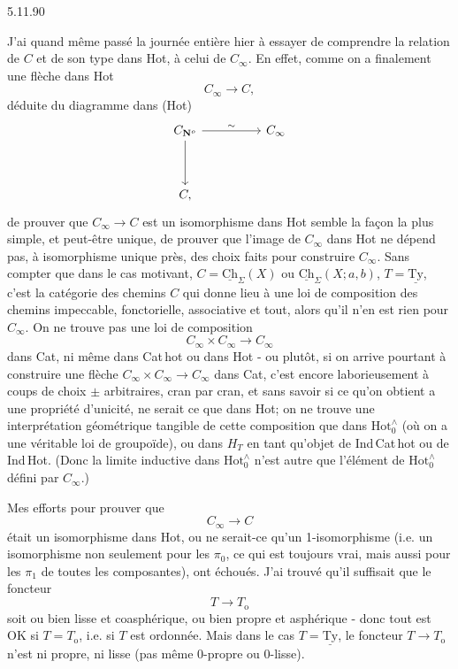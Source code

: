 \documentclass[11pt]{article}
\newcommand{\printedpage}[1]{\marginpar{\footnotesize p.~#1}}
\newcommand{\msp}[1]{\marginpar{\footnotesize [#1]}}
\newcommand{\Hotz}{\mathrm{Hot}^{\wedge}_{0}}
\newcommand{\Ch}{\underline{\mathrm{Ch}}}
\newcommand{\Ty}{\underline{\mathrm{Ty}}}
\newcommand{\CNo}{C_{\mathbf{N}^{o}}}
\begin{document}
\begin{flushright}
{\footnotesize 5.11.90}
\end{flushright}

J'ai quand même passé la journée entière hier à essayer de comprendre la relation de $C$ et de son type dans Hot, à celui de $C_{\infty}$. En effet, comme on a finalement une flèche dans Hot
\[
C_{\infty} \longrightarrow C,
\]
déduite du diagramme dans (Hot)
\[
\begin{tikzcd}[column sep=huge, row sep=huge]
\CNo \arrow[r, "\sim"] \arrow[d] & C_{\infty} \\
C, &
\end{tikzcd}
\]
de prouver que $C_{\infty} \longrightarrow C$ est un isomorphisme dans Hot
\msp{page 111}
semble la façon la plus simple, et peut-être unique, de prouver que l'image de $C_{\infty}$ dans Hot ne dépend pas, à isomorphisme unique près, des choix faits pour construire $C_{\infty}$. Sans compter que dans le cas motivant, $C = \Ch_{\Sigma}(X)$ ou $\Ch_{\Sigma}(X;a,b)$, $T = \Ty$, c'est la catégorie des chemins $C$ qui donne lieu à une loi de composition des chemins impeccable, fonctorielle, associative et tout, alors qu'il n'en est rien pour $C_{\infty}$. On ne trouve pas une loi de composition
\[
C_{\infty} \times C_{\infty} \longrightarrow C_{\infty}
\]
dans Cat, ni même dans Cat\,hot ou dans Hot - ou plutôt, si on arrive pourtant à construire une flèche $C_{\infty} \times C_{\infty} \longrightarrow C_{\infty}$ dans Cat, c'est encore laborieusement à coups de choix $\pm$ arbitraires, cran par cran, et sans savoir si ce qu'on obtient a une propriété d'unicité, ne serait ce que dans Hot; on ne trouve une interprétation géométrique tangible de cette composition que dans $\Hotz$ (où on a une véritable loi de groupoïde), ou dans $H_{T}$ en tant qu'objet de Ind\,Cat\,hot
\printedpage{71}
\msp{page 112}
ou de Ind\,Hot. (Donc la limite inductive dans $\Hotz$ n'est autre que l'élément de $\Hotz$ défini par $C_{\infty}$.)

Mes efforts pour prouver que
\[
C_{\infty} \longrightarrow C
\]
était un isomorphisme dans Hot, ou ne serait-ce qu'un 1-isomorphisme (i.e. un isomorphisme non seulement pour les $\pi_{0}$, ce qui est toujours vrai, mais aussi pour les $\pi_{1}$ de toutes les composantes), ont échoués. J'ai trouvé qu'il suffisait que le foncteur %
\[
T \longrightarrow T_{\mathrm{o}}
\]
soit ou bien lisse et coasphérique, ou bien propre et asphérique - donc tout est OK si $T = T_{\mathrm{o}}$, i.e. si $T$ est ordonnée. Mais dans le cas $T = \Ty$, le foncteur $T \longrightarrow T_{\mathrm{o}}$ n'est ni propre, ni lisse (pas même 0-propre ou 0-lisse).
\end{document}
